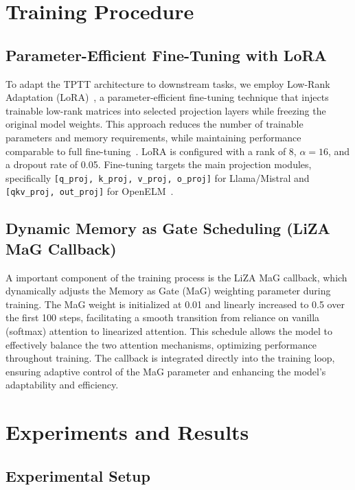 \documentclass[10pt,a4paper]{article}
\begin{document}
\section{Training Procedure}

\subsection{Parameter-Efficient Fine-Tuning with LoRA}

To adapt the TPTT architecture to downstream tasks, we employ Low-Rank Adaptation (LoRA)~\cite{hu2022lora, lora_hf}, a parameter-efficient fine-tuning technique that injects trainable low-rank matrices into selected projection layers while freezing the original model weights. This approach reduces the number of trainable parameters and memory requirements, while maintaining performance comparable to full fine-tuning~\cite{hu2022lora, lora_hf}. LoRA is configured with a rank of 8, $\alpha=16$, and a dropout rate of 0.05. Fine-tuning targets the main projection modules, specifically \texttt{[q\_proj, k\_proj, v\_proj, o\_proj]} for Llama/Mistral and \texttt{[qkv\_proj, out\_proj]} for OpenELM~\cite{lora_hf}.

\subsection{Dynamic Memory as Gate Scheduling (LiZA MaG Callback)}

A important component of the training process is the LiZA MaG callback, which dynamically adjusts the Memory as Gate (MaG) weighting parameter during training. The MaG weight is initialized at 0.01 and linearly increased to 0.5 over the first 100 steps, facilitating a smooth transition from reliance on vanilla (softmax) attention to linearized attention. This schedule allows the model to effectively balance the two attention mechanisms, optimizing performance throughout training. The callback is integrated directly into the training loop, ensuring adaptive control of the MaG parameter and enhancing the model's adaptability and efficiency.


\section{Experiments and Results}

\subsection{Experimental Setup}
\end{document}
